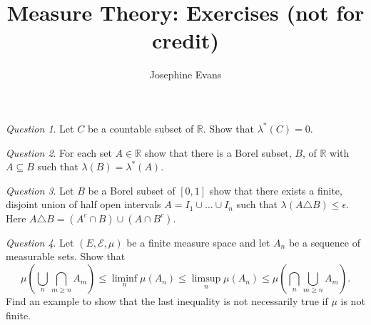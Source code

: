 \documentclass[11pt]{article}
\author{
Josephine Evans
}
\title{Measure Theory: Exercises (not for credit)}
\theoremstyle{definition}
\theoremstyle{remark}
\newtheorem{q}{Question}
\begin{document}
\maketitle

\begin{q}
Let $C$ be a countable subset of $\mathbb{R}$. Show that $\lambda^*(C) = 0$.
\end{q}

\begin{q}
For each set $A \in \mathbb{R}$ show that there is a Borel subset, $B$, of $\mathbb{R}$ with $A \subseteq B$ such that $\lambda(B) = \lambda^*(A)$.
\end{q}

\begin{q}
Let $B$ be a Borel subset of $[0,1]$ show that there exists a finite, disjoint union of half open intervals $A = I_1 \cup \dots \cup I_n$ such that $\lambda(A \triangle B) \leq \epsilon$. Here $A \triangle B = (A^c \cap B) \cup (A \cap B^c)$. 
\end{q}

\begin{q}
Let $(E, \mathcal{E}, \mu)$ be a finite measure space and let $A_n$ be a sequence of measurable sets. Show that
\[ \mu \left( \bigcup_n \bigcap_{m \geq n} A_m \right) \leq \liminf_n \mu(A_n) \leq \limsup_n \mu(A_n) \leq \mu \left( \bigcap_n \bigcup_{m \geq n} A_m\right).\] Find an example to show that the last inequality is not necessarily true if $\mu$ is not finite.
\end{q}
\end{document}
